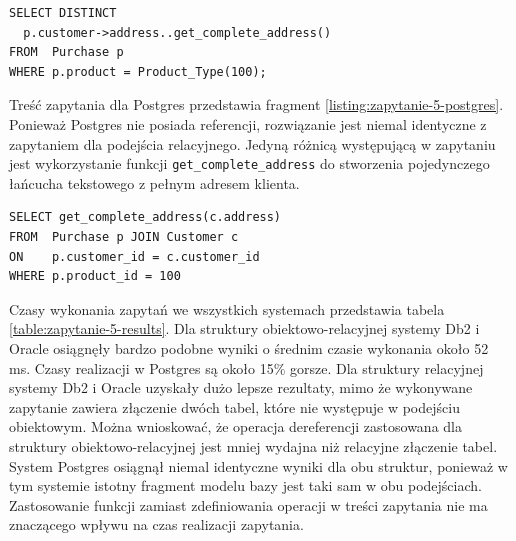 \documentclass[a4paper,twoside,12pt]{book}
\begin{document}
\begin{lstlisting}[style=SQL, caption={Zapytanie piąte w Db2.}, label={listing:zapytanie-5-db2}, captionpos=b]
SELECT DISTINCT 
  p.customer->address..get_complete_address()
FROM  Purchase p
WHERE p.product = Product_Type(100);
\end{lstlisting}

Treść zapytania dla Postgres przedstawia fragment \ref{listing:zapytanie-5-postgres}. Ponieważ Postgres nie posiada referencji, rozwiązanie jest niemal identyczne z zapytaniem dla podejścia relacyjnego. Jedyną różnicą występującą w zapytaniu jest wykorzystanie funkcji \lstinline{get_complete_address} do stworzenia pojedynczego łańcucha tekstowego z pełnym adresem klienta.

\begin{lstlisting}[style=SQL, caption={Zapytanie piąte w Postgres}, label={listing:zapytanie-5-postgres}, captionpos=b]
SELECT get_complete_address(c.address)
FROM  Purchase p JOIN Customer c 
ON    p.customer_id = c.customer_id
WHERE p.product_id = 100
\end{lstlisting}

Czasy wykonania zapytań we wszystkich systemach przedstawia tabela \ref{table:zapytanie-5-results}. Dla struktury obiektowo-relacyjnej systemy Db2 i Oracle osiągnęły bardzo podobne wyniki o średnim czasie wykonania około 52 ms. Czasy realizacji w Postgres są około 15\% gorsze. Dla struktury relacyjnej systemy Db2 i Oracle uzyskały dużo lepsze rezultaty, mimo że wykonywane zapytanie zawiera złączenie dwóch tabel, które nie występuje w podejściu obiektowym. Można wnioskować, że operacja dereferencji zastosowana dla struktury obiektowo-relacyjnej jest mniej wydajna niż relacyjne złączenie tabel. System Postgres osiągnął niemal identyczne wyniki dla obu struktur, ponieważ w tym systemie istotny fragment modelu bazy jest taki sam w obu podejściach.  Zastosowanie funkcji zamiast zdefiniowania operacji w treści zapytania nie ma znaczącego wpływu na czas realizacji zapytania.
\end{document}
